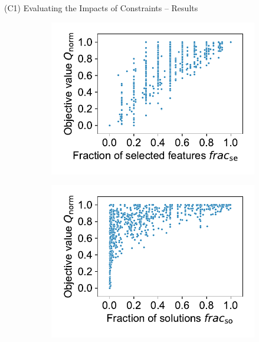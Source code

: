 \documentclass[en, navbarinline, handout]{sdqbeamer}
\begin{document}
\begin{frame}[t]{(C1) Evaluating the Impacts of Constraints -- Results}
	\begin{figure}
		\centering
		\begin{subfigure}{0.48\textwidth}
			\centering
			\includegraphics[width=\textwidth, trim={0 15 0 10}, clip]{plots/syn-selected-vs-objective.pdf}
		\end{subfigure}
		\hfill
		\begin{subfigure}{0.48\textwidth}
			\centering
			\includegraphics[width=\textwidth, trim={0 15 0 10}, clip]{plots/syn-solutions-vs-objective.pdf}

\end{subfigure}
\end{figure}
\end{frame}
\end{document}
